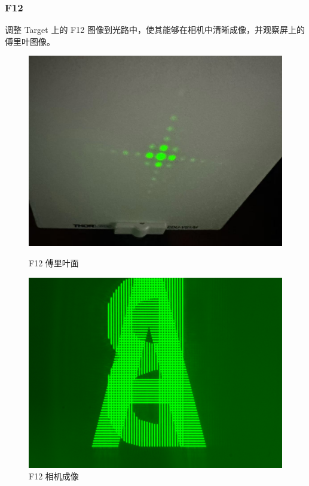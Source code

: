 \documentclass{ctexart}
\begin{document}
\subsubsection{F12}
调整 Target 上的 F12 图像到光路中，使其能够在相机中清晰成像，并观察屏上的傅里叶图像。
\begin{figure}[H]
  \centering
  \begin{minipage}[b]{0.2\textwidth}
    \centering
    \includegraphics[width=\textwidth]{pictures/微信图片_20241017164831.jpg}
    \caption{F12 傅里叶面}
  \end{minipage}
  \hspace{0.1\textwidth} %
  \begin{minipage}[b]{0.3\textwidth}
    \centering
    \includegraphics[width=\textwidth]{pictures/F12-nomask.png}
    \caption{F12 相机成像}
  \end{minipage}
\end{figure}
\end{document}
